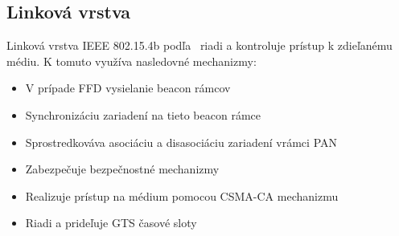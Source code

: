 \subsection{Linková vrstva}
\indent\indent
Linková vrstva IEEE 802.15.4b podľa~\cite{ieee06} riadi a kontroluje prístup k zdieľanému médiu. K tomuto využíva nasledovné mechanizmy:
\begin{itemize}
\item V prípade FFD vysielanie beacon rámcov
\item Synchronizáciu zariadení na tieto beacon rámce
\item Sprostredkováva asociáciu a disasociáciu zariadení vrámci PAN
\item Zabezpečuje bezpečnostné mechanizmy
\item Realizuje prístup na médium pomocou CSMA-CA mechanizmu
\item Riadi a prideľuje GTS časové sloty 
\end{itemize}